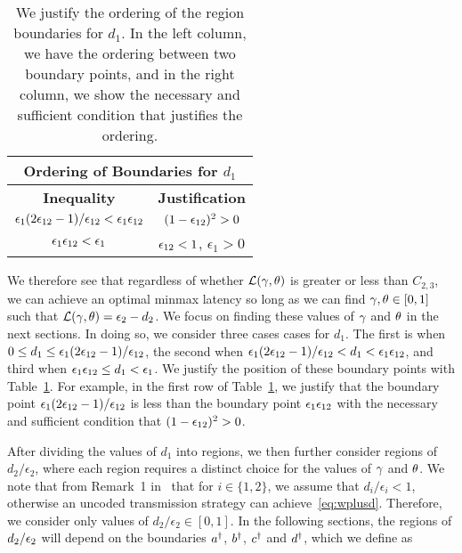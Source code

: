 \begin{table}
	\begin{center}
		\begin{tabular}{| c | c |}
			\hline
			\multicolumn{2}{|c|}{{\bf Ordering of Boundaries for $d_1$}} \\
			\hline
			{\bf Inequality} & {\bf Justification}   \\ \hline
			$\epsilon_1 (2\epsilon_{12} - 1)/\epsilon_{12} < \epsilon_1\epsilon_{12}$ & $(1 - \epsilon_{12})^2 > 0$ \\ \hline 
			$\epsilon_1\epsilon_{12} < \epsilon_1$ & $\epsilon_{12} < 1$, $\epsilon_1 > 0$ \\ \hline 
			\hline
		\end{tabular}
	\end{center}
	\caption{We justify the ordering of the region boundaries for $d_1$.  In the left column, we have the ordering between two boundary points, and in the right column, we show the necessary and sufficient condition that justifies the ordering.}	
	\label{tab:d1_boundaries}	
\end{table}


We therefore see that regardless of whether $\mathcal{L}(\gamma, \theta)$ is greater or less than $C_{2, 3}$, we can achieve an optimal minmax latency so long as we can find $\gamma, \theta \in [0, 1]$ such that $\mathcal{L}(\gamma, \theta) = \epsilon_2 - d_2$.   We focus on finding these values of $\gamma$ and $\theta$ in the next sections. In doing so, we consider three cases cases for $d_1$.  
%
The first is when $0 \leq d_1 \leq \epsilon_1 (2\epsilon_{12} - 1)/\epsilon_{12}$, the second when $\epsilon_1 (2\epsilon_{12} - 1)/\epsilon_{12} < d_1 < \epsilon_1\epsilon_{12}$, and third when $\epsilon_1\epsilon_{12} \leq d_1 < \epsilon_1$.  We justify the position of these boundary points with Table~\ref{tab:d1_boundaries}.  For example, in the first row of Table~\ref{tab:d1_boundaries}, we justify that the boundary point $\epsilon_1 (2\epsilon_{12} - 1)/\epsilon_{12}$ is less than the boundary point $\epsilon_1\epsilon_{12}$ with the necessary and sufficient condition that $(1 - \epsilon_{12})^2 > 0$.  

After dividing the values of $d_1$ into regions, we then further consider regions of $d_2/\epsilon_2$, where each region requires a distinct choice for the values of $\gamma$ and $\theta$.  We note that from Remark~1 in~\cite{TLKS_TIT16} that for $i \in \{1, 2\}$, we assume that $d_i/\epsilon_i < 1$, otherwise an uncoded transmission strategy can achieve~\eqref{eq:wplusd}.  Therefore, we consider only values of $d_2/\epsilon_2 \in [0, 1]$.  In the following sections, the regions of $d_2/\epsilon_2$ will depend on the boundaries $a^{\dagger}$, $b^{\dagger}$, $c^{\dagger}$ and $d^{\dagger}$, which we define as

